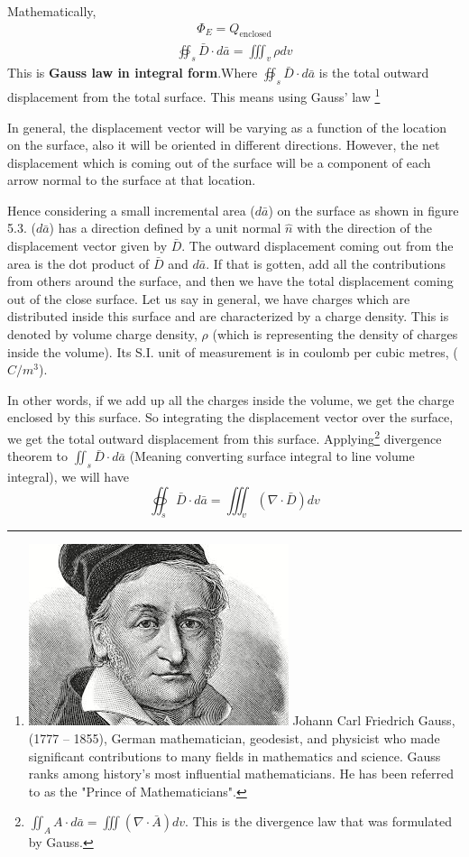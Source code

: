 Mathematically, 
\begin{align}
	\Phi_E = Q_{\text{enclosed}}
\end{align}
\begin{align}
	\boxed{\oiint_s\bar{D}\cdot{d\bar{a}} = \iiint_v\rho dv}
\end{align}
This is \textbf{Gauss law in integral form}.Where $\oiint_s\bar{D}\cdot d\bar{a}$ is the total outward displacement from the total surface. This means using Gauss' law
\footnote[5]{\includegraphics[scale=0.2]{graphics/gauss} 
Johann Carl Friedrich Gauss, (1777 – 1855), German mathematician, geodesist, and physicist who made significant contributions to many fields in mathematics and science. Gauss ranks among history's most influential mathematicians. He has been referred to as the "Prince of Mathematicians". 
}

In general, the displacement vector will be varying as a function of the location on the surface, also it will be oriented in different directions. However, the net displacement which is coming out of the surface will be a component of each arrow normal to the surface at that location.

Hence considering a small incremental area ($ d\bar{a} $) on the surface as shown in figure 5.3. ($ d\bar{a} $) has a direction defined by a unit normal $ \hat{n} $ with the direction of the displacement vector given by $ \bar{D} $. The outward displacement coming out from the area is the dot product of $ \bar{D} $ and $ d\bar{a} $. If that is gotten, add all the contributions from others around the surface, and then we have the total displacement coming out of the close surface. Let us say in general, we have charges which are distributed inside this surface and are characterized by a charge density. This is denoted by volume charge density, $ \rho $ (which is representing the density of charges inside the volume). Its S.I. unit of measurement is in coulomb per cubic metres, ($ C/m^{3} $).

In other words, if we add up all the charges inside the volume, we get the charge enclosed by this surface. So integrating the displacement vector over the surface, we get the total outward displacement from this surface. 
Applying\footnote[6]{
	$	\iint_A A\cdot d\bar{a} = \iiint (\nabla\cdot \bar{A})dv $. This is the divergence law that was formulated by Gauss.
} divergence theorem to $\iint_s\bar{D}\cdot d\bar{a}$ (Meaning converting surface integral to line volume integral), we will have 
\begin{equation*}
	\oiint_s\bar{D} \cdot d\bar{a} = \iiint_v(\nabla\cdot \bar{D})dv
\end{equation*}


